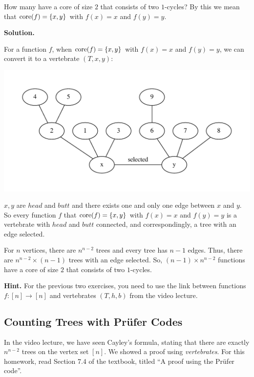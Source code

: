 \begin{exercise}
How many have a core of size $2$ that consists of two $1$-cycles? By this we mean
that $\textnormal{core}(f) = \{x,y\}$ with $f(x) = x$ and $f(y) = y$.
\end{exercise}
\textbf{Solution.}

For a function $f$, when $\textnormal{core}(f) = \{x,y\}$ with $f(x) = x$ and $f(y) = y$, we can convert it to a vertebrate $(T,x,y)$:

\includegraphics[width = .8\textwidth]{ver.pdf}

$x,y$ are $head$ and $butt$ and there exists one and only one edge between $x$ and $y$. So every function $f$ that $\textnormal{core}(f) = \{x,y\}$ with $f(x) = x$ and $f(y) = y$ is a vertebrate with $head$ and $butt$ connected, and correspondingly, a tree with an edge selected.

For $n$ vertices, there are $n^{n-2}$ trees and every tree has $n-1$ edges. Thus, there are $n^{n-2}\times (n-1)$ trees with an edge selected. So, $(n-1) \times n^{n-2}$ functions have a core of size $2$ that consists of two $1$-cycles.

\textbf{Hint.} For the previous two exercises, you need to use the link between functions
 $f: [n]\rightarrow [n]$ and
vertebrates $(T,h,b)$ from the video lecture.

\subsection{Counting Trees with Pr\"ufer Codes}

In the video lecture, we have seen Cayley's formula, stating that there are exactly
$n^{n-2}$ trees on the vertex set $[n]$. We showed a proof using
{\em vertebrates}. For this homework, read Section 7.4 of the textbook, titled
``A proof using the Pr\"ufer code''.


